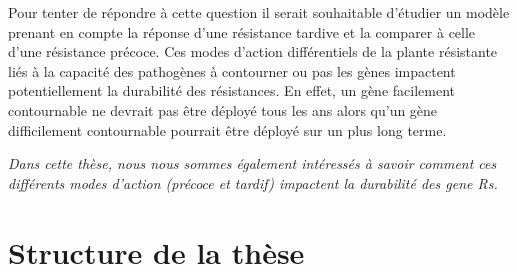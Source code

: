 	Pour tenter de répondre à cette question il serait souhaitable d’étudier un modèle
prenant en compte la réponse d'une résistance tardive  et la comparer à celle d'une résistance précoce.
Ces modes d'action différentiels de la plante résistante liés à la capacité des pathogènes à
contourner ou pas les gènes impactent potentiellement la durabilité des résistances.  En effet, un gène facilement contournable ne  devrait pas être déployé tous les ans alors qu'un gène difficilement contournable pourrait être déployé sur un plus long terme.

\textit{Dans cette thèse, nous nous sommes également  intéressés  à savoir comment ces différents modes d'action (précoce et tardif) impactent  la durabilité des \glspl{gene R}.
}

\section{Structure de la thèse}

